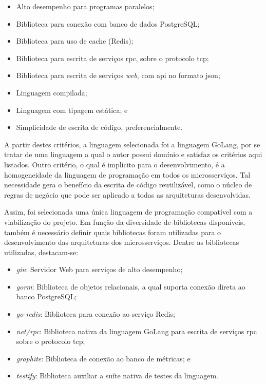 \begin{itemize}
  \item Alto desempenho para programas paralelos;
  \item Biblioteca para conexão com banco de dados PostgreSQL;
  \item Biblioteca para uso de cache (Redis);
  \item Biblioteca para escrita de serviços \ac{rpc}, sobre o protocolo \ac{tcp};
  \item Biblioteca para escrita de serviços \textit{web}, com \ac{api} no formato \ac{json};
  \item Linguagem compilada;
  \item Linguagem com tipagem estática; e
  \item Simplicidade de escrita de código, preferencialmente.
\end{itemize}



A partir destes critérios, a linguagem selecionada foi a linguagem GoLang, por se tratar de uma linguagem a qual o autor possui domínio e satisfaz os critérios aqui listados.
%
Outro critério, o qual é implícito para o desenvolvimento, é a homogeneidade da linguagem de programação em todos os microsserviços.
%
Tal necessidade gera o benefício da escrita de código reutilizável, como o núcleo de regras de negócio que pode ser aplicado a todas as arquiteturas desenvolvidas.



Assim, foi selecionada uma única linguagem de programação compatível com a viabilização do projeto.
%
Em função da diversidade de bibliotecas disponíveis, também é necessário definir quais bibliotecas foram utilizadas para o desenvolvimento das arquiteturas dos microsserviços.
%
Dentre as bibliotecas utilizadas, destacam-se:



\begin{itemize}
  \item \textit{gin}: Servidor Web para serviços de alto desempenho;
  \item \textit{gorm}: Biblioteca de objetos relacionais, a qual suporta conexão direta ao banco PostgreSQL;
  \item \textit{go-redis}: Biblioteca para conexão ao serviço Redis;
  \item \textit{net/rpc}: Biblioteca nativa da linguagem GoLang para escrita de serviços \ac{rpc} sobre o protocolo \ac{tcp};
  \item \textit{graphite}: Biblioteca de conexão ao banco de métricas; e
  \item \textit{testify}: Biblioteca auxiliar a suíte nativa de testes da linguagem.
\end{itemize}



